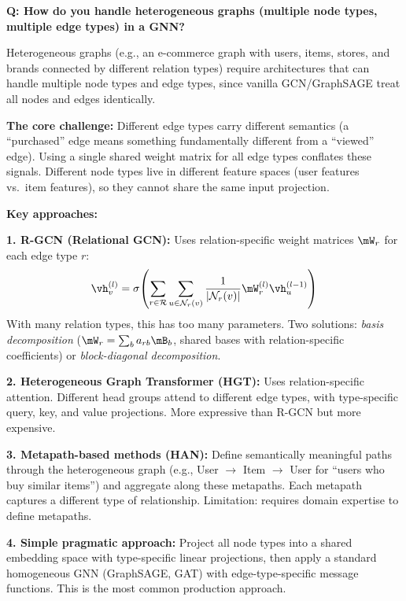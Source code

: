 \begin{interviewq}
\textbf{Q: How do you handle heterogeneous graphs (multiple node types, multiple edge types) in a GNN?}

 \quad {} \quad \badgefreq{\freqmed}

\stronganswer

Heterogeneous graphs (e.g., an e-commerce graph with users, items, stores, and brands connected by different relation types) require architectures that can handle multiple node types and edge types, since vanilla GCN/GraphSAGE treat all nodes and edges identically.

\textbf{The core challenge:} Different edge types carry different semantics (a ``purchased'' edge means something fundamentally different from a ``viewed'' edge). Using a single shared weight matrix for all edge types conflates these signals. Different node types live in different feature spaces (user features vs.\ item features), so they cannot share the same input projection.

\textbf{Key approaches:}

\textbf{1. R-GCN (Relational GCN):} Uses relation-specific weight matrices $\mW_r$ for each edge type $r$:
\[
\vh_v^{(l)} = \sigma\!\left(\sum_{r \in \mathcal{R}} \sum_{u \in \mathcal{N}_r(v)} \frac{1}{|\mathcal{N}_r(v)|} \mW_r^{(l)} \vh_u^{(l-1)}\right)
\]
With many relation types, this has too many parameters. Two solutions: \textit{basis decomposition} ($\mW_r = \sum_b a_{rb} \mB_b$, shared bases with relation-specific coefficients) or \textit{block-diagonal decomposition}.

\textbf{2. Heterogeneous Graph Transformer (HGT):} Uses relation-specific attention. Different head groups attend to different edge types, with type-specific query, key, and value projections. More expressive than R-GCN but more expensive.

\textbf{3. Metapath-based methods (HAN):} Define semantically meaningful paths through the heterogeneous graph (e.g., User $\to$ Item $\to$ User for ``users who buy similar items'') and aggregate along these metapaths. Each metapath captures a different type of relationship. Limitation: requires domain expertise to define metapaths.

\textbf{4. Simple pragmatic approach:} Project all node types into a shared embedding space with type-specific linear projections, then apply a standard homogeneous GNN (GraphSAGE, GAT) with edge-type-specific message functions. This is the most common production approach.


\end{interviewq}
